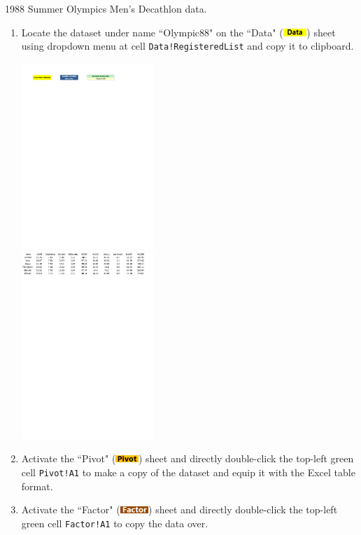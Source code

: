 \documentclass[article]{jss}
\newcommand{\shtData}{``Data" (\includegraphics[height=8pt, keepaspectratio=true]{DataSheetTab_png}) }
\newcommand{\shtPivot}{``Pivot" (\includegraphics[height=8pt, keepaspectratio=true]{PivotSheetTab_png}) }
\newcommand{\shtFactor}{``Factor" (\includegraphics[height=8pt, keepaspectratio=true]{FactorSheetTab_png}) }
\begin{document}
        1988 Summer Olympics Men's Decathlon data. 
        \begin{enumerate}
          \item Locate the dataset under name ``Olympic88" on the \shtData sheet using dropdown menu at cell \texttt{Data!RegisteredList} and copy it to clipboard.
          \begin{center}
            \includegraphics[height=200pt, keepaspectratio=true]{img/DataSheet_Olympic88_Selector}\\
            \includegraphics[height=200pt, keepaspectratio=true]{img/DataSheet_Olympic88_Data}
          \end{center}
          \item Activate the \shtPivot sheet and directly double-click the top-left green cell \texttt{Pivot!A1} to make a copy of the dataset and equip it with the Excel table format.
          \item Activate the \shtFactor sheet and directly double-click the top-left green cell \texttt{Factor!A1} to copy the data over.
          \begin{center}

\end{center}
\end{enumerate}
\end{document}
